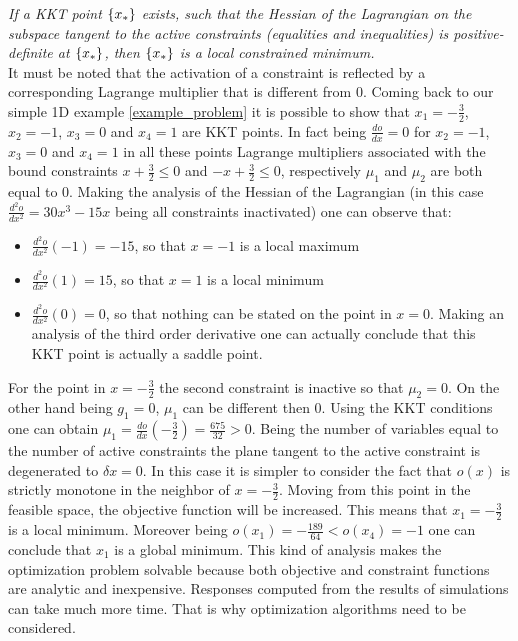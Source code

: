\textit{ If a KKT point $\left\lbrace{x_*}\right \rbrace$ exists, such that the Hessian of the Lagrangian on the subspace tangent to the active constraints (equalities and inequalities) is positive-definite at $\left\lbrace{x_*}\right \rbrace$, then $\left\lbrace{x_*}\right \rbrace$ is a local constrained minimum.}\\
It must be noted that the activation of a constraint is reflected by a corresponding Lagrange multiplier that is different from 0.
Coming back to our simple 1D example \ref{example_problem} it is possible to show that $x_1=-\frac{3}{2}$,$x_2=-1$, $x_3=0$ and $x_4=1$ are KKT points. In fact being $\frac{do}{dx}=0$ for $x_2=-1$, $x_3=0$ and $x_4=1$ in all these points Lagrange multipliers associated with the bound constraints $x+\frac{3}{2}\leq 0$ and $-x+\frac{3}{2}\leq 0$, respectively $\mu_1$ and $\mu_2$ are both equal to 0.
Making the analysis of the Hessian of the Lagrangian (in this case $\frac{d^2 o}{dx^2}=30x^3-15x$ being all constraints inactivated) one can observe that: 
\begin{itemize}
\item $\frac{d^2 o}{dx^2}(-1)=-15$, so that $x=-1$ is a local maximum
\item $\frac{d^2 o}{dx^2}(1)=15$, so that $x=1$ is a local minimum
\item $\frac{d^2 o}{dx^2}(0)=0$, so that nothing can be stated on the point in $x=0$. Making an analysis of the third order derivative one can actually conclude that this KKT point is actually a saddle point.
\end{itemize}
For the point in $x=-\frac{3}{2}$ the second constraint is inactive so that $\mu_2=0$. On the other hand being $g_1=0$, $\mu_1$ can be different then 0. Using the KKT conditions one can obtain $\mu_1=\frac{do}{dx}(-\frac{3}{2})=\frac{675}{32}>0$. Being the number of variables equal to the number of active constraints the plane tangent to the active constraint is degenerated to $\delta x=0$. In this case it is simpler to consider the fact that $o(x)$ is strictly monotone in the neighbor of $x=-\frac{3}{2}$. Moving from this point in the feasible space, the objective function will be increased.  This means that $x_1= -\frac{3}{2}$ is a local minimum. Moreover being $o(x_1)=-\frac{189}{64}< o(x_4)=-1$ one can conclude that $x_1$ is a global minimum. This kind of analysis makes the optimization problem solvable because both objective and constraint functions are analytic and inexpensive. Responses computed from the results of simulations can take much more time. That is why optimization algorithms need to be considered.
